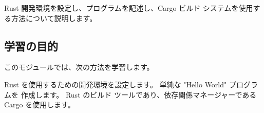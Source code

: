 
Rust 開発環境を設定し、プログラムを記述し、Cargo ビルド システムを使用する方法について説明します。

\subsection{学習の目的}

このモジュールでは、次の方法を学習します。

\begin{itemize}
Rust を使用するための開発環境を設定します。
単純な "Hello World" プログラムを 作成します。
Rust のビルド ツールであり、依存関係マネージャーである Cargo を使用します。
\end{itemize}




